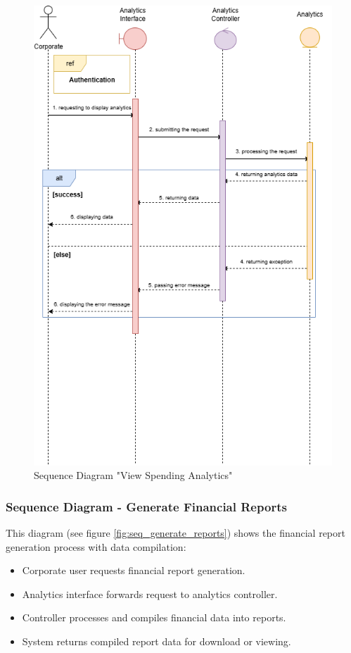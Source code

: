 \begin{figure}[H] 
  \centering
  \includegraphics[width=\textwidth,keepaspectratio]{images/seq_view_spending_analytics.png}
  \caption{Sequence Diagram "View Spending Analytics"}
  \label{fig:seq_view_analytics}
\end{figure}

\subsubsection{Sequence Diagram - Generate Financial Reports}
This diagram (see figure \ref{fig:seq_generate_reports}) shows the financial report generation process with data compilation:
\begin{itemize}[nosep,leftmargin=*]
  \item Corporate user requests financial report generation.
  \item Analytics interface forwards request to analytics controller.
  \item Controller processes and compiles financial data into reports.
  \item System returns compiled report data for download or viewing.
\end{itemize}

